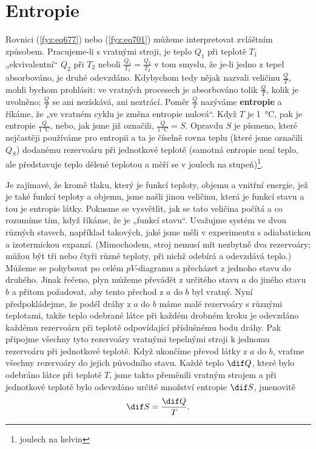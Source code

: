   \section{Entropie}\label{fyz:IchapXLIVsecVI}
    Rovnici (\ref{fyz:eq677}) nebo (\ref{fyz:eq701}) můžeme interpretovat zvláštním způsobem.
    Pracujeme-li s vratnými stroji, je teplo \(Q_1\) při teplotě \(T_1\) „ekvivalentní“ \(Q_2\) při
    \(T_2\) neboli \(\frac{Q_1}{ T_1} = \frac{Q_2}{T_2}\) v tom smyslu, že je-li jedno z tepel
    absorbováno, je druhé odevzdáno. Kdybychom tedy nějak nazvali veličinu \(\frac{Q}{T}\), mohli
    bychom prohlásit: ve vratných procesech je absorbováno tolik \(\frac{Q}{T}\), kolik je uvolněno;
    \(\frac{Q}{T}\) se ani nezískává, ani neztrácí. Poměr \(\frac{Q}{T}\) nazýváme \textbf{entropie}
    a říkáme, že „ve vratném cyklu je změna entropie nulová“. Když \(T\) je \SI{1}{\celsius}, pak je
    entropie \(\frac{Q}{\SI{1}{\celsius}}\), nebo, jak jsme již označili,
    \(\frac{Q}{\SI{1}{\celsius}} = S\). Opravdu \(S\) je písmeno, které nejčastěji používáme pro
    entropii a ta je číselně rovna teplu (které jsme označili \(Q_S\)) dodanému rezervoáru při
    jednotkové teplotě (samotná entropie není teplo, ale představuje teplo dělené teplotou a měří se
    v joulech na stupeň)\footnote{joulech na kelvin}.
    
    Je zajímavé, že kromě tlaku, který je funkcí teploty, objemu a vnitřní energie, jež je také
    funkcí teploty a objemu, jsme našli jinou veličinu, která je funkcí stavu a tou je entropie
    látky. Pokusme se vysvětlit, jak se tato veličina počítá a co rozumíme tím, když říkáme, že je
    „funkcí stavu“. Uvažujme systém ve dvou různých stavech, například takových, jaké jsme měli v
    experimentu s adiabatickou a izotermickou expanzí. (Mimochodem, stroj nemusí mít nezbytně dva
    rezervoáry; můžou být tři nebo čtyři různé teploty, při nichž odebírá a odevzdává teplo.) Můžeme
    se pohybovat po celém \(pV\)-diagramu a přecházet z jednoho stavu do druhého. Jinak řečeno, plyn
    můžeme převádět z určitého stavu \(a\) do jiného stavu \(b\) a přitom požadovat, aby tento
    přechod z \(a\) do \(b\) byl vratný. Nyní předpokládejme, že podél dráhy z \(a\) do \(b\) máme
    malé rezervoáry s různými teplotami, takže teplo odebrané látce při každém drobném kroku je
    odevzdáno každému rezervoáru při teplotě odpovídající příslušnému bodu dráhy. Pak připojme
    všechny tyto rezervoáry vratnými tepelnými stroji k jednomu rezervoáru při jednotkové teplotě.
    Když ukončíme převod látky z \(a\) do \(b\), vraťme všechny rezervoáry do jejich původního
    stavu. Každé teplo \(\dif Q\), které bylo odebráno látce při teplotě \(T\), jsme takto přeměnili
    vratným strojem a při jednotkové teplotě bylo odevzdáno určité množství entropie \(\dif S\),
    jmenovitě
    \begin{equation}\label{fyz:eq704}
      \dif S=\frac{\dif Q}{T}.
    \end{equation}

